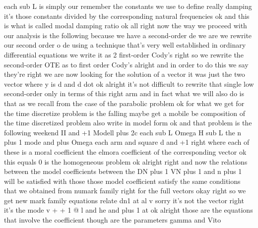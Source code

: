 \documentclass[10pt]{article}
\begin{document}
each sub L is simply our remember the constants we use to define really damping it's those constants divided by the corresponding natural frequencies ok and this is what is called modal damping ratio ok all right now the way we proceed with our analysis is the following because we have a second-order de we are we rewrite our second order o de using a technique that's very well established in ordinary differential equations we write it as 2 first-order Cody's right so we rewrite the second-order OTE as to first order Cody's alright and in order to do this we say they're right we are now looking for the solution of a vector it was just the two vector where y is d and d dot ok alright it's not difficult to rewrite that single low second-order only in terms of this right arm and in fact what we will also do is that as we recall from the case of the parabolic problem ok for what we get for the time discretize problem is the falling maybe get a mobile be composition of the time discretized problem also write in model form ok and that problem is the following weekend II and +1 Modell plus 2c each sub L Omega H sub L the n plus 1 mode and plus Omega each arm and square d and +1 right where each of these is a moral coefficient the elmora coefficient of the corresponding vector ok this equals 0 is the homogeneous problem ok alright right and now the relations between the model coefficients between the DN plus 1 VN plus 1 and n plus 1 will be satisfied with those those model coefficient satisfy the same conditions that we obtained from numark family right for the full vectors okay right so we get new mark family equations relate dn1 at al v sorry it's not the vector right it's the mode v + + 1 @ l and he and plus 1 at ok alright those are the equations that involve the coefficient though are the parameters gamma and Vito
\end{document}
